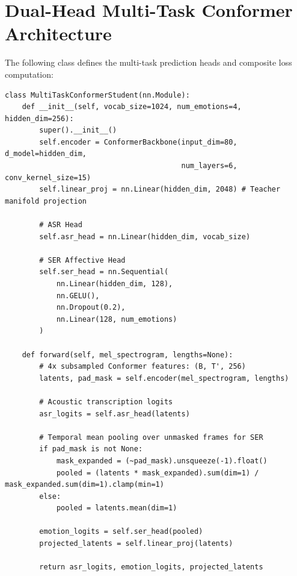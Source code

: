 \section{Dual-Head Multi-Task Conformer Architecture}
The following class defines the multi-task prediction heads and composite loss computation:

\begin{singlespace}
\begin{verbatim}
class MultiTaskConformerStudent(nn.Module):
    def __init__(self, vocab_size=1024, num_emotions=4, hidden_dim=256):
        super().__init__()
        self.encoder = ConformerBackbone(input_dim=80, d_model=hidden_dim, 
                                         num_layers=6, conv_kernel_size=15)
        self.linear_proj = nn.Linear(hidden_dim, 2048) # Teacher manifold projection

        # ASR Head
        self.asr_head = nn.Linear(hidden_dim, vocab_size)

        # SER Affective Head
        self.ser_head = nn.Sequential(
            nn.Linear(hidden_dim, 128),
            nn.GELU(),
            nn.Dropout(0.2),
            nn.Linear(128, num_emotions)
        )

    def forward(self, mel_spectrogram, lengths=None):
        # 4x subsampled Conformer features: (B, T', 256)
        latents, pad_mask = self.encoder(mel_spectrogram, lengths)

        # Acoustic transcription logits
        asr_logits = self.asr_head(latents)

        # Temporal mean pooling over unmasked frames for SER
        if pad_mask is not None:
            mask_expanded = (~pad_mask).unsqueeze(-1).float()
            pooled = (latents * mask_expanded).sum(dim=1) / mask_expanded.sum(dim=1).clamp(min=1)
        else:
            pooled = latents.mean(dim=1)

        emotion_logits = self.ser_head(pooled)
        projected_latents = self.linear_proj(latents)

        return asr_logits, emotion_logits, projected_latents
\end{verbatim}
\end{singlespace}
